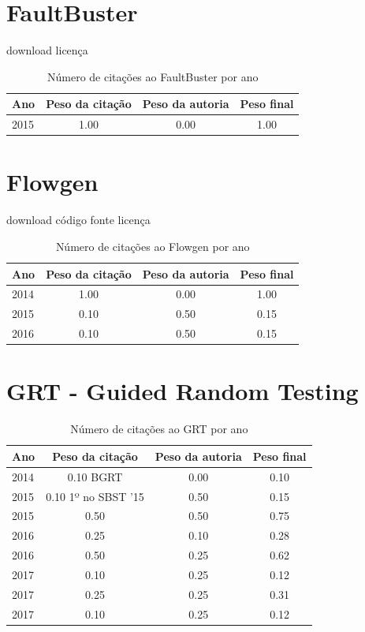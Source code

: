 \section{FaultBuster}
\checkmark download
\checkmark licença
\begin{table}[H]
\caption{Número de citações ao FaultBuster por ano}
\centering
\begin{tabular}{| l | c | c | c |}
  \hline
  Ano & Peso da citação & Peso da autoria & Peso final \\
  \hline
  2015
    & 1.00
    & 0.00
    & {\color{blue} 1.00} \\
\hline
\end{tabular}
\end{table}
\section{Flowgen}
\checkmark download
\checkmark código fonte
\checkmark licença
\begin{table}[H]
\caption{Número de citações ao Flowgen por ano}
\centering
\begin{tabular}{| l | c | c | c |}
  \hline
  Ano & Peso da citação & Peso da autoria & Peso final \\
  \hline
  2014
    & 1.00
    & 0.00
    & {\color{blue} 1.00} \\
\hline
  2015
    & 0.10
    & 0.50
    & {\color{red} 0.15} \\
\hline
  2016
    & 0.10
    & 0.50
    & {\color{red} 0.15} \\
\hline
\end{tabular}
\end{table}
\section{GRT - Guided Random Testing}
\begin{table}[H]
\caption{Número de citações ao GRT  por ano}
\centering
\begin{tabular}{| l | c | c | c |}
  \hline
  Ano & Peso da citação & Peso da autoria & Peso final \\
  \hline
  2014
    & 0.10
          {\tiny BGRT}
    & 0.00
    & {\color{red} 0.10} \\
\hline
  2015
    & 0.10
          {\tiny 1º no SBST '15}
    & 0.50
    & {\color{red} 0.15} \\
  2015
    & 0.50
    & 0.50
    & {\color{blue} 0.75} \\
\hline
  2016
    & 0.25
    & 0.10
    & {\color{red} 0.28} \\
  2016
    & 0.50
    & 0.25
    & {\color{blue} 0.62} \\
\hline
  2017
    & 0.10
    & 0.25
    & {\color{red} 0.12} \\
  2017
    & 0.25
    & 0.25
    & {\color{red} 0.31} \\
  2017
    & 0.10
    & 0.25
    & {\color{red} 0.12} \\
\hline
\end{tabular}
\end{table}
